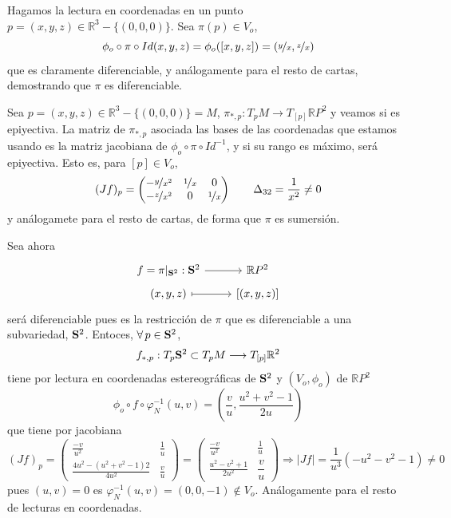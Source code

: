 \begin{sol}
    Hagamos la lectura en coordenadas en un punto $p=(x,y,z)\in \mathbb R^3-\{(0,0,0)\}$. Sea $\pi(p)\in V_o$, 
    $$\phi_o \circ \pi \circ Id(x,y,z) = \phi_o([x,y,z]) = \left(\nicefrac{y}{x} , \nicefrac{z}{x}\right)$$
    que es claramente diferenciable, y an\'alogamente para el resto de cartas, demostrando que $\pi$ es diferenciable.

    Sea $p=(x,y,z)\in \mathbb R^3-\{(0,0,0)\}=M$, $\pi_{*,p}: T_pM \longrightarrow T_{[p]}\mathbb RP^2$ y veamos si es epiyectiva. La matriz de $\pi_{*,p}$ asociada las bases de las coordenadas que estamos usando es la matriz jacobiana de $\phi_o \circ \pi \circ Id^{-1}$, y si su rango es m\'aximo, ser\'a epiyectiva. Esto es, para $[p]\in V_o$,
    $$(Jf)_p= \begin{pmatrix}
        -\nicefrac{y}{x^2} & \nicefrac{1}{x} & 0 \\ -\nicefrac{z}{x^2} & 0 & \nicefrac{1}{x}
    \end{pmatrix}\qquad \Delta_{32} = \dfrac{1}{x^2} \neq 0$$
    y an\'alogamete para el resto de cartas, de forma que $\pi$ es sumersi\'on.

    Sea ahora $$\bt f=\pi|_{\bold S^2}: \bold S^2 \arrow{r} & \mathbb RP^2 \\[-5mm] (x,y,z) \arrow[mapsto]{r} & \left[(x,y,z)\right] \et$$
    ser\'a diferenciable pues es la restricci\'on de $\pi$ que es diferenciable a una subvariedad, $\bold S^2$. Entoces, $\forall \, p \in \bold S^2$, 
    $$f_{*,p}:T_p\bold S^2 \subset T_pM \longrightarrow T_{[p]}\mathbb R^2$$
    tiene por lectura en coordenadas estereogr\'aficas de $\bold S^2$ y $(V_o,\phi_o)$ de $\mathbb RP^2$
    $$\phi_o \circ f \circ \varphi^{-1}_N(u,v) = \left( \dfrac{v}{u}, \dfrac{u^2+v^2-1}{2u} \right)$$
    que tiene por jacobiana
    $$(Jf)_p=\begin{pmatrix}
        \frac{-v}{u^2} & \frac{1}{u} \\ \frac{4u^2-(u^2+v^2-1)2}{4u^2} & \frac{v}{u}
    \end{pmatrix}= \begin{pmatrix}
        \frac{-v}{u^2} & \frac{1}{u} \\ \frac{u^2-v^2+1}{2u^2} & \dfrac{v}{u}
    \end{pmatrix} \Rightarrow |Jf| = \dfrac{1}{u^3} (-u^2-v^2-1) \neq 0$$
    pues $(u,v)=0$ es $\varphi^{-1}_N(u,v) = (0,0,-1) \nin V_o$. An\'alogamente para el resto de lecturas en coordenadas. 
\end{sol}
\begin{ejer}
    [3.36] 
\end{ejer}
